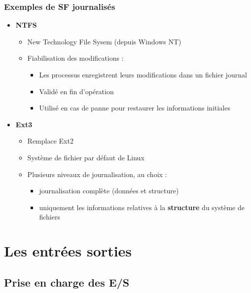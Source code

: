 \begin{frame}
\frametitle{Exemples de SF journalisés}
\begin{itemize}
\item \textbf{NTFS}
\begin{itemize}
\item New Technology File Sysem (depuis Windows NT)
\item Fiabilisation des modifications :
\begin{itemize}
\item Les processus enregistrent leurs modifications dans un fichier journal
\item Validé en fin d'opération
\item Utilisé en cas de panne pour restaurer les informations initiales
\end{itemize}
\end{itemize}
\item \textbf{Ext3}
\begin{itemize}
\item Remplace Ext2
\item Système de fichier par défaut de Linux
\item Plusieurs niveaux de journalisation, au choix :
\begin{itemize}
\item journalisation complète (données et structure)
\item uniquement les informations relatives à la \textbf{structure} du système de fichiers
\end{itemize}
\end{itemize}
\end{itemize}
\end{frame}

\section{Les entrées sorties}
\subsection{Prise en charge des E/S}


